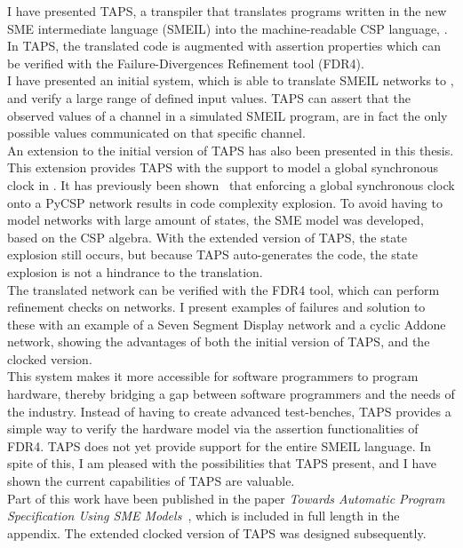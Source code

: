 I have presented TAPS, a transpiler that translates programs written in the
new SME intermediate language (SMEIL) into the machine-readable CSP language,
\cspm{}. In TAPS, the translated \cspm{} code is augmented with assertion
properties which can be verified with the Failure-Divergences Refinement tool
(FDR4).\\
I have presented an initial system, which is able to translate SMEIL networks to
\cspm{}, and verify a large range of defined input values. TAPS can assert that
the observed values of a channel in a simulated SMEIL program, are in fact the
only possible values communicated on that specific channel. \\

An extension to the initial version of TAPS has also been presented in this
thesis. This extension provides TAPS with the support to model a global
synchronous clock in \cspm{}. It has previously been shown~\cite{Skaarup14}
that enforcing a global synchronous clock onto a PyCSP network results in code complexity explosion. To avoid having to model networks with large amount of
states, the SME model was developed, based on the CSP algebra. With the
extended version of TAPS, the state explosion still occurs, but because TAPS auto-generates the \cspm{} code, the state explosion is not a hindrance to the
translation.\\

The translated \cspm{} network can be verified with the FDR4 tool, which can
perform refinement checks on \cspm{} networks. I present examples of failures
and solution to these with an example of a Seven Segment Display network and a
cyclic Addone network, showing the advantages of both the initial version of TAPS, and the clocked version.\\

This system makes it more accessible for software programmers to program
hardware, thereby bridging a gap between software programmers and the needs
of the industry.
Instead of having to create advanced test-benches, TAPS provides a simple
way to verify the hardware model via the assertion functionalities of FDR4.
TAPS does not yet provide support for the entire SMEIL language. In spite of this,
I am pleased with the possibilities that TAPS present, and I have shown the current capabilities of TAPS are valuable.\\

Part of this work have been published in the paper \textit{Towards Automatic Program Specification Using SME Models}~\cite{TheglerEtAl2018}, which is included in full length in the appendix. The extended clocked version of TAPS was designed subsequently.
